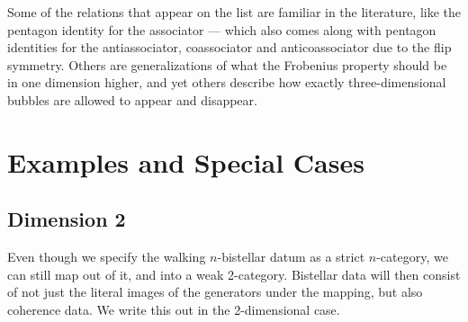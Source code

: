 \documentclass[12pt,a4paper]{article}
\numberwithin{equation}{section}
\begin{document}
\begin{remark}
    Some of the relations that appear on the list are familiar in the literature, like the pentagon identity for the associator --- which also comes along with pentagon identities for the antiassociator, coassociator and anticoassociator due to the flip symmetry. Others are generalizations of what the Frobenius property should be in one dimension higher, and yet others describe how exactly three-dimensional bubbles are allowed to appear and disappear.
\end{remark}



\section{Examples and Special Cases}\label{sec:special_cases}

\setcounter{subsection}{-1}
\subsection{Dimension 2}


Even though we specify the walking $n$-bistellar datum as a strict $n$-category, we can still map out of it, and into a weak 2-category. Bistellar data will then consist of not just the literal images of the generators under the mapping, but also coherence data. We write this out in the 2-dimensional case.
\end{document}
